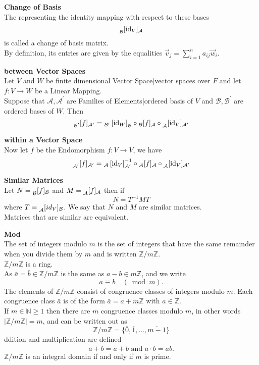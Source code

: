 \documentclass[a4paper, 10pt]{article}
\begin{document}
\begin{multicols*}{3}
\textbf{Change of Basis}\\
The representing the identity mapping with respect to these bases
$$
\prescript{}{\mathcal{B}}{\left[\mathrm{id}_V\right]}_{\mathcal{A}}
$$
is called a change of basis matrix.\\ 
By definition, its entries are given by the equalities $\vec{v}_j=\sum_{i=1}^n a_{i j} \vec{w}_i$.

\textbf{between Vector Spaces}\\
Let $V$ and $W$ be finite dimensional Vector Space|vector spaces over $F$ and let $f: V \rightarrow W$ be a Linear Mapping. \\
Suppose that $\mathcal{A}, \mathcal{A}^{\prime}$ are Families of Elements|ordered basis of $V$ and $\mathcal{B}, \mathcal{B}^{\prime}$ are ordered bases of $W$. 
Then
$$
\prescript{}{\mathcal{B}^{\prime}}[f]_{\mathcal{A}^{\prime}}={ }_{\mathcal{B}^{\prime}}\left[\mathrm{id}_W\right]_{\mathcal{B}} \circ{ }_{\mathcal{B}}[f]_{\mathcal{A}} \circ \prescript{}{\mathcal{A}}[\mathrm{id}_V]_{\mathcal{A}^{\prime}}
$$

\textbf{within a Vector Space}\\
Now let $f$ be the Endomorphism $f:V\rightarrow V$, we have
$$
\prescript{}{\mathcal{A}^{\prime}}[f]_{\mathcal{A}^{\prime}}={ }_{\mathcal{A}}\left[\mathrm{id}_V\right]_{\mathcal{A}^\prime}^{-1} \circ{ }_{\mathcal{A}}[f]_{\mathcal{A}} \circ \prescript{}{\mathcal{A}}[\mathrm{id}_V]_{\mathcal{A}^{\prime}}
$$

\textbf{Similar Matrices}\\
Let $N=\prescript{}{\mathcal{B}}[f]_\mathcal{B}$ and $M=\prescript{}{\mathcal{A}}[f]_\mathcal{A}$ then if 
$$N=T^{-1}MT$$
where $T=\prescript{}{\mathcal{A}}[id_V]_\mathcal{B}$.
We say that $N$ and $M$ are similar matrices.\\
Matrices that are similar are equivalent. 

\textbf{Mod}\\
The set of integers modulo $m$ is the set of integers that have the same remainder when you divide them by $m$ and is written $\mathbb{Z} / m \mathbb{Z}$.\\
$\mathbb{Z} / m \mathbb{Z}$ is a ring. \\
As $\bar{a}=\bar{b}\in\mathbb{Z}/m\mathbb{Z}$ is the same as $a-b \in m \mathbb{Z}$, and we write
$$
a \equiv b \quad(\bmod m) .
$$
The elements of $\mathbb{Z} / m \mathbb{Z}$ consist of congruence classes of integers modulo $m$. Each congruence class $\bar{a}$ is of the form $\bar{a}=a+m \mathbb{Z}$ with $a \in \mathbb{Z}$. \\
If $m \in \mathbb{N} \geqslant 1$ then there are $m$ congruence classes modulo $m$, in other words $|\mathbb{Z} / m \mathbb{Z}|=m$, and can be written out as 
$$
\mathbb{Z} / m \mathbb{Z}=\{\overline{0}, \overline{1}, \ldots, \overline{m-1}\}
$$
ddition and multiplication are defined
$$
\bar{a}+\bar{b}=\overline{a+b} \text { and } \bar{a} \cdot \bar{b}=\overline{a b} .
$$
$\mathbb{Z} / m \mathbb{Z}$ is an integral domain if and only if $m$ is prime.


\end{multicols*}
\end{document}
